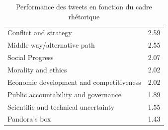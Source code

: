             \begin{table}
                \caption{Performance des tweets en fonction du cadre rhétorique}
                \label{table:23perfmean}
                \centering
                \small
                \begin{tabularx}{\textwidth}{|K{0.5\textwidth}|R|}
                    \hline
                    &	 \\ \hline

                    Conflict and strategy&	2.59\\ \hline
                    Middle way/alternative path	&2.55\\ \hline
                    Social Progress&	2.07\\ \hline
                    Morality and ethics&2.02\\ \hline
                    Economic development and competitiveness&	2.02\\ \hline
                    Public accountability and governance&	1.89\\ \hline
                    Scientific and technical uncertainty&	1.55\\ \hline
                    Pandora’s box&	1.43\\ \hline


                \end{tabularx}
            \end{table}



